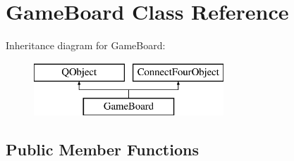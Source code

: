 \hypertarget{class_game_board}{\section{Game\-Board Class Reference}
\label{class_game_board}
}
Inheritance diagram for Game\-Board\-:\begin{figure}[H]
\begin{center}
\leavevmode
\includegraphics[height=2.000000cm]{class_game_board}
\end{center}
\end{figure}
\subsection*{Public Member Functions}
